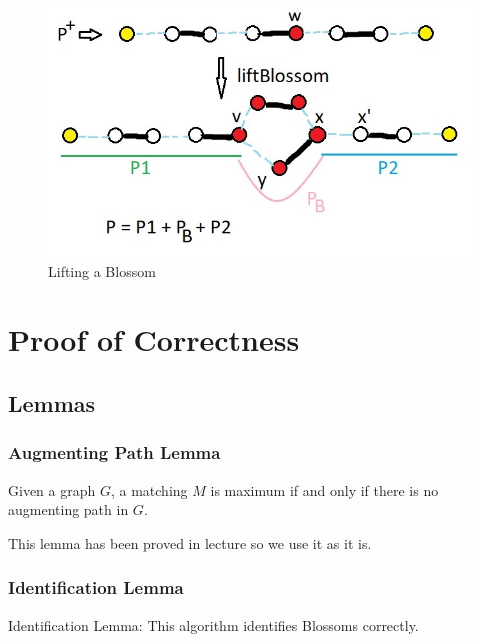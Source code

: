 \begin{figure}[!h]
    \centering
    \includegraphics[scale=0.58]{lifting.jpg}
    \caption{Lifting a Blossom}
\end{figure}


\section{Proof of Correctness}
\subsection{Lemmas}
\subsubsection{Augmenting Path Lemma}
Given a graph $G$, a matching $M$ is maximum if and only if there is no augmenting path in $G$.

This lemma has been proved in lecture so we use it as it is.

\subsubsection{Identification Lemma}
Identification Lemma: This algorithm identifies Blossoms correctly.

